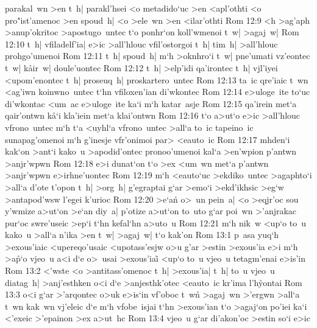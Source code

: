 parakal~wn
>en
t~h|
parakl'hsei
<o
metadido`uc
>en
<apl'othti
<o
pro"ist'amenoc
>en
spoud~h|
<o
>ele~wn
>en
<ilar'othti\bibvsend
\vs Rom 12:9
<h
>ag'aph
>anup'okritoc
>apostugo~untec
t`o
ponhr`on
koll'wmenoi
t~w|
>agaj~w|\bibvsend
\vs Rom 12:10
t~h|
vfiladelf'ia|
e>ic
>all'hlouc
vfil'ostorgoi
t~h|
tim~h|
>all'hlouc
prohgo'umenoi\bibvsend
\vs Rom 12:11
t~h|
spoud~h|
m`h
>oknhro`i
t~w|
pne'umati
vz'eontec
t~w|
k\r{a}ir~w|
doule'uontec\bibvsend
\vs Rom 12:12
t~h|
>elp'idi
qa'irontec
t~h|
vjl'iyei
<upom'enontec
t~h|
proseuq~h|
proskartero~untec\bibvsend
\vs Rom 12:13
ta~ic
qre'iaic
t~wn
<ag'iwn
koinwno~untec
t`hn
vfiloxen'ian
di'wkontec\bibvsend
\vs Rom 12:14
e>uloge~ite
to`uc
di'wkontac
<um~ac
e>uloge~ite
ka`i
m`h
katar~asje\bibvsend
\vs Rom 12:15
qa'irein
met`a
qair'ontwn
k\r{a}`i
kla'iein
met`a
klai'ontwn\bibvsend
\vs Rom 12:16
t`o
a>ut`o
e>ic
>all'hlouc
vfrono~untec
m`h
t`a
<uyhl`a
vfrono~untec
>all`a
to~ic
tapeino~ic
sunapag'omenoi
m`h
g'inesje
vfr'onimoi
par>
<eauto~ic\bibvsend
\vs Rom 12:17
mhden`i
kak`on
>ant`i
kako~u
>apodid'ontec
pronoo'umenoi
kal`a
>en'wpion
p'antwn
>anjr'wpwn\bibvsend
\vs Rom 12:18
e>i
dunat`on
t`o
>ex
<um~wn
met`a
p'antwn
>anjr'wpwn
e>irhne'uontec\bibvsend
\vs Rom 12:19
m`h
<eauto`uc
>ekdiko~untec
>agaphto`i
>all`a
d'ote
t'opon
t~h|
>org~h|
g'egraptai
g`ar
>emo`i
>ekd'ikhsic
>eg`w
>antapod'wsw
l'egei
k'urioc\bibvsend
\vs Rom 12:20
>e`an\r{}
o>~un
pein~a|
<o
>eqjr'oc
sou
y'wmize
a>ut`on
>e`an
diy~a|
p'otize
a>ut`on
to~uto
g`ar
poi~wn
>'anjrakac
pur`oc
swre'useic
>ep`i
t`hn
kefal`hn
a>uto~u\bibvsend
\vs Rom 12:21
m`h
nik~w
<up`o
to~u
kako~u
>all`a
n'ika
>en
t~w|
>agaj~w|
t`o
kak'on\bibvsend
\vs Rom 13:1
p~asa
yuq`h
>exous'iaic
<upereqo'usaic
<upotass'esjw
o>u
g'ar
>estin
>exous'ia
e>i
m`h
>a\r{p}`o
vjeo~u
a<i
d`e
o>~usai
>exous'iai\r{}
<up`o
to~u
vjeo~u
tetagm'enai
e>is'in\bibvsend
\vs Rom 13:2
<'wste
<o
>antitass'omenoc
t~h|
>exous'ia|
t~h|
to~u
vjeo~u
diatag~h|
>anj'esthken
o<i
d`e
>anjesthk'otec
<eauto~ic
kr'ima
l'h\r{y}ontai\bibvsend
{}
\vs Rom 13:3
o<i
g`ar
>'arqontec
o>uk
e>is`in
vf'oboc
t~wn\r{}
>agaj~wn
>'ergwn
>all`a
t~wn
kak~wn
vj'eleic
d`e
m`h
vfobe~isjai
t`hn
>exous'ian
t`o
>agaj`on
po'iei
ka`i
<'exeic
>'epainon
>ex
a>ut~hc\bibvsend
\vs Rom 13:4
vjeo~u
g`ar
di'akon'oc
>estin
so`i
e>ic
